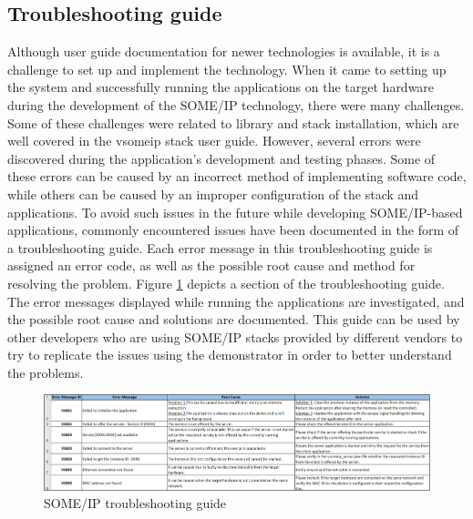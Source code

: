 \subsection{Troubleshooting guide}
Although user guide documentation for newer technologies is available, it is a challenge to set up and implement the technology. When it came to setting up the system and successfully running the applications on the target hardware during the development of the SOME/IP technology, there were many challenges. Some of these challenges were related to library and stack installation, which are well covered in the vsomeip stack user guide\cite{b_vsomeip_userguide}. However, several errors were discovered during the application's development and testing phases. Some of these errors can be caused by an incorrect method of implementing software code, while others can be caused by an improper configuration of the stack and applications. To avoid such issues in the future while developing SOME/IP-based applications, commonly encountered issues have been documented in the form of a troubleshooting guide. Each error message in this troubleshooting guide is assigned an error code, as well as the possible root cause and method for resolving the problem. Figure \ref{fig:troubleshooting_guide} depicts a section of the troubleshooting guide. The error messages displayed while running the applications are investigated, and the possible root cause and solutions are documented. This guide can be used by other developers who are using SOME/IP stacks provided by different vendors to try to replicate the issues using the demonstrator in order to better understand the problems.

\begin{figure}[!htb]
	\centering
		\includegraphics[width=1\textwidth]{images/troubleshooting_guide.png}
	\caption{SOME/IP troubleshooting guide}
	\label{fig:troubleshooting_guide}
\end{figure}
